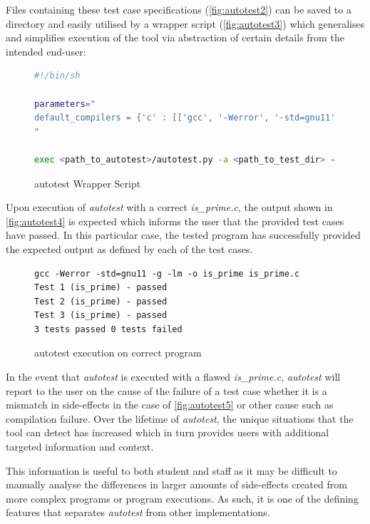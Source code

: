 \documentclass[hidelinks]{report}
\begin{document}
Files containing these test case specifications (\autoref{fig:autotest2}) can be saved to a directory and easily utilised by a wrapper script (\autoref{fig:autotest3}) which generalises and simplifies execution of the tool via abstraction of certain details from the intended end-user:

\begin{figure}[h]
	\centering
	\begin{lstlisting}[language=bash, breaklines=true, linewidth=\linewidth]
#!/bin/sh

parameters="
default_compilers = {'c' : [['gcc', '-Werror', '-std=gnu11', '-g', '-lm']]}
"

exec <path_to_autotest>/autotest.py -a <path_to_test_dir> --parameters "$parameters" "$@"
	\end{lstlisting}
	\caption{autotest Wrapper Script}
	\label{fig:autotest3}
\end{figure}

Upon execution of \textit{autotest} with a correct \textit{is\_prime.c}, the output shown in \autoref{fig:autotest4} is expected which informs the user that the provided test cases have passed. In this particular case, the tested program has successfully provided the expected output as defined by each of the test cases.

\begin{figure}[h]
	\centering
	\begin{lstlisting}[breaklines=true, linewidth=\linewidth]
gcc -Werror -std=gnu11 -g -lm -o is_prime is_prime.c
Test 1 (is_prime) - passed
Test 2 (is_prime) - passed
Test 3 (is_prime) - passed
3 tests passed 0 tests failed
	\end{lstlisting}
	\caption{autotest execution on correct program}
	\label{fig:autotest4}
\end{figure}

In the event that \textit{autotest} is executed with a flawed \textit{is\_prime.c}, \textit{autotest} will report to the user on the cause of the failure of a test case whether it is a mismatch in side-effects in the case of \autoref{fig:autotest5} or other cause such as compilation failure. Over the lifetime of \textit{autotest}, the unique situations that the tool can detect has increased which in turn provides users with additional targeted information and context.

This information is useful to both student and staff as it may be difficult to manually analyse the differences in larger amounts of side-effects created from more complex programs or program executions.  As such, it is one of the defining features that separates \textit{autotest} from other implementations.
\end{document}
